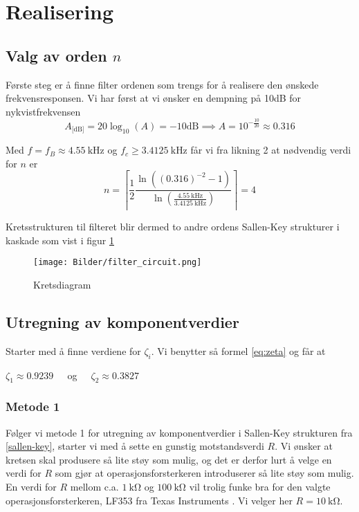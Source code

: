 \section{Realisering}
\label{realisering}
\subsection{Valg av orden $n$}
Første steg er å finne filter ordenen som trengs for å realisere den ønskede frekvensresponsen. Vi har først at vi 
ønsker en dempning på 10dB for nykvistfrekvensen
\[
    A_{\text{[dB]}} = 20 \log_{10}(A) = -10\text{dB} \implies A = 10^{-\frac{10}{20}} \approx 0.316
\]

Med $f = f_B \approx \SI{4.55}{\kilo\hertz}$ og $f_c \geq \SI{3.4125}{\kilo\hertz}$ får vi fra likning 2 at nødvendig 
verdi for $n$ er
\[
    n = \left\lceil\frac{1}{2}\frac{\ln{\left((0.316)^{-2} - 1\right)}}{\ln{\left(\frac{\SI{4.55}{\kilo\hertz}}{\SI{3.4125}{\kilo\hertz}}\right)}}\right\rceil = 4
\]

Kretsstrukturen til filteret blir dermed to andre ordens Sallen-Key strukturer i kaskade som vist i figur \ref{fig:filter-circuit}
\begin{figure}[H]
    \centering
    \texttt{[image: Bilder/filter\_circuit.png]}
    \caption{Kretsdiagram}
    \label{fig:filter-circuit}
\end{figure}

\subsection{Utregning av komponentverdier}
Starter med å finne verdiene for $\zeta_i$. Vi benytter så formel \ref{eq:zeta} og får at 
\begin{center}

    $\zeta_1 \approx 0.9239\:\:\:\:\:$ og $\:\:\:\:\:\zeta_2 \approx 0.3827$
\end{center}

\subsubsection{Metode 1}
Følger vi metode 1 for utregning av komponentverdier i Sallen-Key strukturen fra \ref{sallen-key}, starter vi
med å sette en gunstig motstandsverdi $R$. Vi ønsker at kretsen skal produsere så lite støy som mulig,
og det er derfor lurt å velge en verdi for $R$ som gjør at operasjonsforsterkeren introduserer så lite støy
som mulig. En verdi for $R$ mellom c.a. $\SI{1}{\kilo\ohm}$ og $\SI{100}{\kilo\ohm}$ vil trolig funke bra 
for den valgte operasjonsforsterkeren, LF353 fra Texas Instruments \cite{opamp}.
Vi velger her $R = \SI{10}{\kilo\ohm}$.

